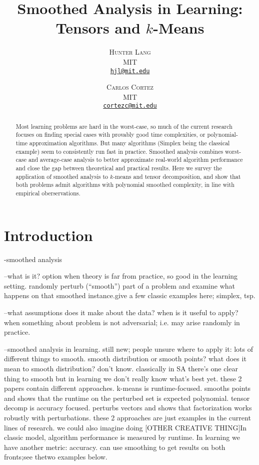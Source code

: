 \documentclass[11pt]{article}
\title{\vspace{-5mm}\fontsize{22pt}{10pt}\selectfont Smoothed Analysis in Learning: Tensors and $k$-Means}
\author{
\large
\textsc{Hunter Lang} \\
\normalsize MIT \\
\normalsize \href{mailto:hjl@mit.edu}{\texttt{hjl@mit.edu}}\\
\and
\textsc{Carlos Cortez} \\
\normalsize MIT \\
\normalsize \href{mailto:cortezc@mit.edu}{\texttt{cortezc@mit.edu}}\\
\vspace{-5mm}
}
\date{}
\theoremstyle{definition}
\begin{document}
\maketitle


\begin{abstract}
\noindent Most learning problems are hard in the worst-case, so much
of the current research focuses on finding special cases with provably
good time complexities, or polynomial-time approximation algorithms. But many algorithms (Simplex being the
classical example) seem to consistently run fast
in practice. Smoothed
analysis combines worst-case and average-case analysis to better
approximate real-world algorithm performance and close the gap between
theoretical and practical results. Here we survey the application of
smoothed analysis to $k$-means and tensor decomposition, and show that
both problems admit algorithms with polynomial smoothed complexity, in line with empirical oberservations.
\end{abstract}

\section{Introduction}
-smoothed analysis

--what is it? option when theory is far from practice, so good in the
learning setting. randomly perturb (``smooth'') part of a problem and
examine what happens on that smoothed instance.give a few classic examples here; simplex, tsp.

--what assumptions does it make about the data? when is it useful to
apply?  when something about problem is not adversarial; i.e. may
arise randomly in practice.

--smoothed analysis in learning. still new; people unsure where to
apply it: lots of different things to smooth. smooth distribution or
smooth points? what does it mean to smooth distribution? don't
know. classically in SA there's one clear thing to smooth but in
learning we don't really know what's best yet. these 2 papers contain
different approaches. k-means is runtime-focused. smooths points and
shows that the runtime on the perturbed set is expected
polynomial. tensor decomp is accuracy focused. perturbs vectors and
shows that factorization works robustly with perturbations. these 2
approaches are just examples in the current lines of research. we
could also imagine doing [OTHER CREATIVE THING]In classic model,
algorithm performance is measured by runtime. In learning we have
another metric: accuracy. can use smoothing to get results on both
fronts;see thetwo examples below.
\end{document}
